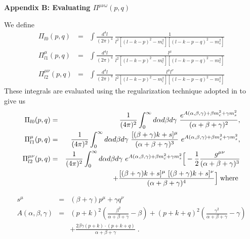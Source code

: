 \documentclass[twoside]{article}
\begin{document}
\begin{appendix}
\setcounter{equation}{0}
\renewcommand{\theequation}{B.\arabic{equation}}

\LARGE
{\bf Appendix B: Evaluating $\Pi^{\mu \nu \omega}(p,q)$}
\normalsize
\vspace{2mm}

We define 
\begin{eqnarray}
\Pi_{l0}(p,q)
&=&
\int \frac{d^4 l}{(2 \pi)^4}~
\frac{1}{l^2 \left[(l - k - p)^2 - m_c^2  \right] \left[  (l - k - p - q)^2 - m_s^2\right]} \nonumber\\
\Pi_{l1}^{\mu}(p,q)
&=&
\int \frac{d^4 l}{(2 \pi)^4}~
\frac{l^\mu}{l^2 \left[(l - k - p)^2 - m_c^2  \right] \left[  (l - k - p - q)^2 - m_s^2\right]} \nonumber\\
\Pi_{l2}^{\mu \nu}(p,q)
&=&
\int \frac{d^4 l}{(2 \pi)^4}~
\frac{l^\mu l^\nu}{l^2 \left[(l - k - p)^2 - m_c^2  \right] \left[  (l - k - p - q)^2 - m_s^2\right]}
\end{eqnarray}
These integrals are evaluated using the regularization technique adopted in \cite{kb17} to give us
\begin{eqnarray}
\Pi_{l0}(p,q)
&=&
\frac{1}{(4 \pi)^2} \int_0^\infty d \alpha d \beta d \gamma ~
\frac{e^{A(\alpha, \beta, \gamma)+ \beta m_c^2 + \gamma m_s^2}}{(\alpha+\beta+\gamma)^2}, \\
\Pi_{l1}^{\mu}(p,q)
&=&
\frac{1}{(4 \pi)^2} \int_0^\infty d \alpha d \beta d \gamma ~
\frac{[(\beta+\gamma)k + s]^\mu}{(\alpha+\beta+\gamma)^3}~
e^{A(\alpha, \beta, \gamma)+ \beta m_c^2 + \gamma m_s^2}, \\
\Pi_{l2}^{\mu \nu}(p,q)
&=&
\frac{1}{(4 \pi)^2} \int_0^\infty d \alpha d \beta d \gamma ~
e^{A(\alpha, \beta, \gamma)+ \beta m_c^2 + \gamma m_s^2} \Big[
- \frac{1}{2} \frac{g^{\mu \nu}}{(\alpha+\beta+\gamma)^3} \nonumber\\&& \qquad
+ \frac{[(\beta+\gamma)k + s]^\mu~[(\beta+\gamma)k + s]^\nu}{(\alpha+\beta
+\gamma)^4} \Big] {\rm \;where\;}
\end{eqnarray}

\begin{eqnarray}
s^\mu &=& (\beta+\gamma)p^\mu + \gamma q^\nu~ \\
A(\alpha, \beta, \gamma)&=& (p+k)^2 (\frac{\beta^2}{\alpha+\beta+\gamma}-\beta)
+(p+k+q)^2(\frac{\gamma^2}{\alpha+\beta+\gamma}-\gamma) \nonumber \\
&& +\frac{2 \beta \gamma (p+k)\cdot(p+k+q)}{\alpha+\beta+\gamma} \; .
\end{eqnarray}


\end{appendix}
\end{document}
